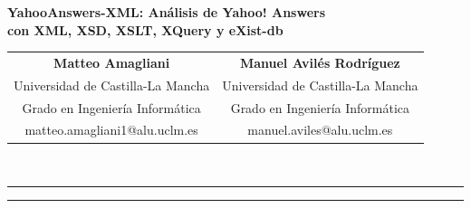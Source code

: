 \documentclass[10pt,twocolumn,a4paper]{article}
\begin{document}

\onecolumn
\begin{center}
  {\large\bfseries YahooAnswers-XML: An\'alisis de Yahoo! Answers\\[4pt]
   con XML, XSD, XSLT, XQuery y eXist-db}\\[10pt]
  \begin{tabular}{cc}
    \textbf{Matteo Amagliani} & \textbf{Manuel Avil\'es Rodr\'iguez} \\[2pt]
    {\small Universidad de Castilla-La Mancha} & {\small Universidad de Castilla-La Mancha} \\
    {\small Grado en Ingenier\'ia Inform\'atica} & {\small Grado en Ingenier\'ia Inform\'atica} \\
    {\small matteo.amagliani1@alu.uclm.es} & {\small manuel.aviles@alu.uclm.es}
  \end{tabular}\\[10pt]
  \rule{0.93\textwidth}{0.4pt}
\end{center}

\begin{abstract}
\noindent
Este documento presenta el dise\~no e implementaci\'on de \textbf{YahooAnswers-XML},
un sistema de an\'alisis del corpus p\'ublico de Yahoo! Answers (octubre~2007)
mediante tecnolog\'ias XML y bases de datos documentales. El sistema procesa
16.952 preguntas y 161.365 respuestas distribuidas en cuatro categor\'ias
tem\'aticas bilingues (espa\~nol e italiano), aplicando un flujo completo
de extracci\'on, validaci\'on, transformaci\'on y consulta. Se describen el
dise\~no del esquema XSD, las transformaciones XSLT, la carga en
\textbf{eXist-db} y las cuatro consultas XQuery desarrolladas para el
an\'alisis de Redes Sociales y Calidad de Datos. Los resultados revelan
patrones de baja simetr\'ia usuario-pregunta/respuesta, diferencias
significativas entre comunidades hispanohablante e italohablante, y una
calidad de datos generalmente alta con algunas anomal\'ias identificadas.
\end{abstract}

\smallskip
{}
\vspace{6pt}

\begin{center}\rule{0.93\textwidth}{0.4pt}\end{center}
\vspace{4pt}
\twocolumn
\end{document}
